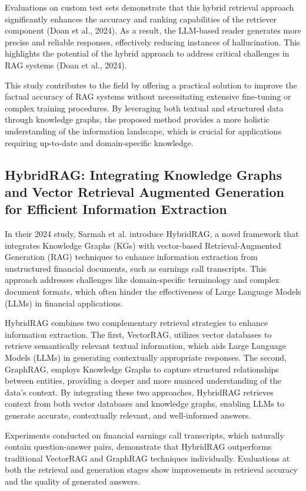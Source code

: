 Evaluations on custom test sets demonstrate that this hybrid retrieval approach significantly enhances the accuracy and ranking capabilities of the retriever component (Doan et al., 2024). As a result, the LLM-based reader generates more precise and reliable responses, effectively reducing instances of hallucination. This highlights the potential of the hybrid approach to address critical challenges in RAG systems (Doan et al., 2024).

This study contributes to the field by offering a practical solution to improve the factual accuracy of RAG systems without necessitating extensive fine-tuning or complex training procedures. By leveraging both textual and structured data through knowledge graphs, the proposed method provides a more holistic understanding of the information landscape, which is crucial for applications requiring up-to-date and domain-specific knowledge.

\subsection{HybridRAG: Integrating Knowledge Graphs and Vector Retrieval Augmented Generation for Efficient Information Extraction}

In their 2024 study, Sarmah et al. introduce HybridRAG, a novel framework that integrates Knowledge Graphs (KGs) with vector-based Retrieval-Augmented Generation (RAG) techniques to enhance information extraction from unstructured financial documents, such as earnings call transcripts. This approach addresses challenges like domain-specific terminology and complex document formats, which often hinder the effectiveness of Large Language Models (LLMs) in financial applications.

HybridRAG combines two complementary retrieval strategies to enhance information extraction. The first, VectorRAG, utilizes vector databases to retrieve semantically relevant textual information, which aids Large Language Models (LLMs) in generating contextually appropriate responses. The second, GraphRAG, employs Knowledge Graphs to capture structured relationships between entities, providing a deeper and more nuanced understanding of the data's context. By integrating these two approaches, HybridRAG retrieves context from both vector databases and knowledge graphs, enabling LLMs to generate accurate, contextually relevant, and well-informed answers.

Experiments conducted on financial earnings call transcripts, which naturally contain question-answer pairs, demonstrate that HybridRAG outperforms traditional VectorRAG and GraphRAG techniques individually. Evaluations at both the retrieval and generation stages show improvements in retrieval accuracy and the quality of generated answers.

